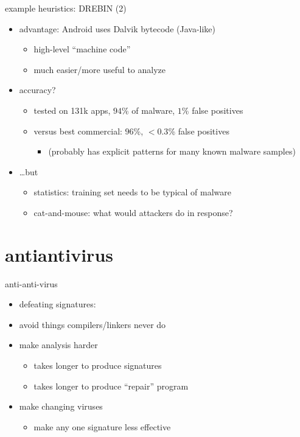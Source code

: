 \begin{frame}{example heuristics: DREBIN (2)}
    \begin{itemize}
    \item advantage: Android uses Dalvik bytecode (Java-like)
        \begin{itemize}
        \item high-level ``machine code''
        \item much easier/more useful to analyze
        \end{itemize}
    \item accuracy?
        \begin{itemize}
        \item tested on 131k apps, $94$\% of malware, $1$\% false positives
        \item versus best commercial: $96$\%, $<0.3$\% false positives
            \begin{itemize}
            \item (probably has explicit patterns for many known malware samples)
            \end{itemize}
        \end{itemize}
    \item \ldots but
        \begin{itemize}
        \item statistics: training set needs to be typical of malware
        \item cat-and-mouse: what would attackers do in response?
        \end{itemize}
    \end{itemize}
\end{frame}

\section{antiantivirus}


\begin{frame}{anti-anti-virus}
    \begin{itemize}
    \item defeating signatures:
    \vspace{.5cm}
    \item avoid things compilers/linkers never do
    \item make analysis harder
        \begin{itemize}
        \item takes longer to produce signatures
        \item takes longer to produce ``repair'' program
        \end{itemize}
    \item make changing viruses
        \begin{itemize}
        \item make any one signature less effective
        \end{itemize}
    \end{itemize}
\end{frame}

